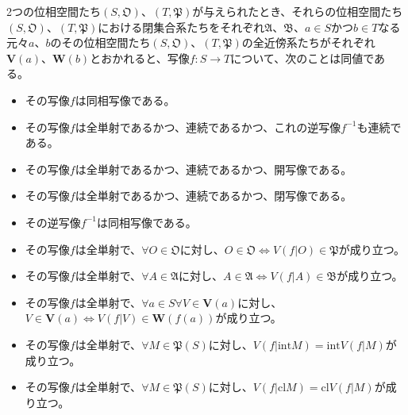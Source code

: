\documentclass[dvipdfmx]{jsarticle}
\begin{document}
\begin{thm}\label{8.1.3.10}
2つの位相空間たち$\left( S,\mathfrak{O} \right)$、$\left( T,\mathfrak{P} \right)$が与えられたとき、それらの位相空間たち$\left( S,\mathfrak{O} \right)$、$\left( T,\mathfrak{P} \right)$における閉集合系たちをそれぞれ$\mathfrak{A}$、$\mathfrak{B}$、$a \in S$かつ$b \in T$なる元々$a$、$b$のその位相空間たち$\left( S,\mathfrak{O} \right)$、$\left( T,\mathfrak{P} \right)$の全近傍系たちがそれぞれ$\mathbf{V}(a)$、$\mathbf{W}(b)$とおかれると、写像$f:S \rightarrow T$について、次のことは同値である。
\begin{itemize}
\item
  その写像$f$は同相写像である。
\item
  その写像$f$は全単射であるかつ、連続であるかつ、これの逆写像$f^{- 1}$も連続である。
\item
  その写像$f$は全単射であるかつ、連続であるかつ、開写像である。
\item
  その写像$f$は全単射であるかつ、連続であるかつ、閉写像である。
\item
  その逆写像$f^{- 1}$は同相写像である。
\item
  その写像$f$は全単射で、$\forall O \in \mathfrak{O}$に対し、$O \in \mathfrak{O \Leftrightarrow}V\left( f|O \right)\in \mathfrak{P}$が成り立つ。
\item
  その写像$f$は全単射で、$\forall A \in \mathfrak{A}$に対し、$A \in \mathfrak{A \Leftrightarrow}V\left( f|A \right)\in \mathfrak{B}$が成り立つ。
\item
  その写像$f$は全単射で、$\forall a \in S\forall V \in \mathbf{V}(a)$に対し、$V \in \mathbf{V}(a) \Leftrightarrow V\left( f|V \right) \in \mathbf{W}\left( f(a) \right)$が成り立つ。
\item
  その写像$f$は全単射で、$\forall M \in \mathfrak{P}(S)$に対し、$V\left( f|{\mathrm{int}}M \right) = {\mathrm{int}}{V\left( f|M \right)}$が成り立つ。
\item
  その写像$f$は全単射で、$\forall M \in \mathfrak{P}(S)$に対し、$V\left( f|{\mathrm{cl}}M \right) = {\mathrm{cl}}{V\left( f|M \right)}$が成り立つ。
\end{itemize}
\end{thm}
\end{document}
